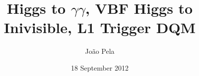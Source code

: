 \documentclass[a4paper,10pt]{book}
\title{Higgs to $\gamma\gamma$, VBF Higgs to Inivisible, L1 Trigger DQM}
\author{João Pela}
\date{18 September 2012}
\begin{document}
 
\maketitle

\tableofcontents


\makeglossaries
\printglossaries
\end{document}

